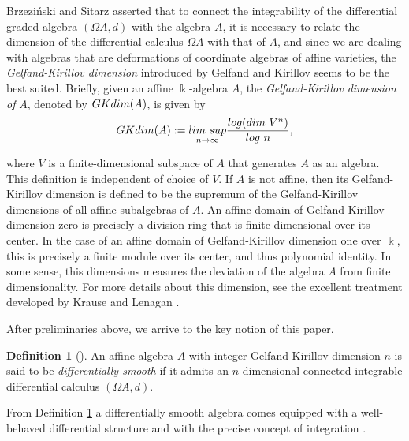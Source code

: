 \documentclass{amsart}
\theoremstyle{definition}
\newtheorem{definition}[theorem]{Definition}
\theoremstyle{remark}
\numberwithin{equation}{section}
\begin{document}
Brzezi\'nski and Sitarz \cite[p. 421]{BrzezinskiSitarz2017} asserted that to connect the integrability of the differential graded algebra $(\Omega A, d)$ with the algebra $A$, it is necessary to relate the dimension of the differential calculus $\Omega A$ with that of $A$, and since we are dealing with algebras that are deformations of coordinate algebras of affine varieties, the {\em Gelfand-Kirillov dimension} introduced by Gelfand and Kirillov \cite{GelfandKirillov1966, GelfandKirillov1966b} seems to be the best suited. Briefly, given an affine $\Bbbk$-algebra $A$, the {\em Gelfand-Kirillov dimension of} $A$, denoted by ${\rm GKdim}(A)$, is given by
\[
{\rm GKdim}(A) := \underset{n\to \infty}{\rm lim\ sup} \frac{{\rm log}({\rm dim}\ V^{n})}{{\rm log}\ n},
\]

where $V$ is a finite-dimensional subspace of $A$ that generates $A$ as an algebra. This definition is independent of choice of $V$. If $A$ is not affine, then its Gelfand-Kirillov dimension is defined to be the supremum of the Gelfand-Kirillov dimensions of all affine subalgebras of $A$. An affine domain of Gelfand-Kirillov dimension zero is precisely a division ring that is finite-dimensional over its center. In the case of an affine domain of Gelfand-Kirillov dimension one over $\Bbbk$, this is precisely a finite module over its center, and thus polynomial identity. In some sense, this dimensions measures the deviation of the algebra $A$ from finite dimensionality. For more details about this dimension, see the excellent treatment developed by Krause and Lenagan \cite{KrauseLenagan2000}.

After preliminaries above, we arrive to the key notion of this paper.

\begin{definition}[{\cite[Definition 2.4]{BrzezinskiSitarz2017}}]\label{BrzezinskiSitarz2017Definition2.4}
An affine algebra $A$ with integer Gelfand-Kirillov dimension $n$ is said to be {\em differentially smooth} if it admits an $n$-dimensional connected integrable differential calculus $(\Omega A, d)$.
\end{definition}

From Definition \ref{BrzezinskiSitarz2017Definition2.4} a differentially smooth algebra comes equipped with a well-behaved differential structure and with the precise concept of integration \cite[p. 2414]{BrzezinskiLomp2018}.
\end{document}

